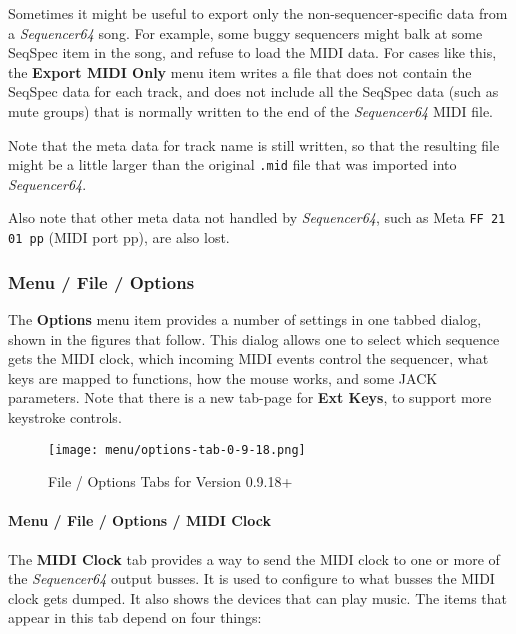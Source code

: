    Sometimes it might be useful to export only the non-sequencer-specific
   data from a \textsl{Sequencer64} song.  For example, some buggy sequencers
   might balk at some SeqSpec item in the song, and refuse to load the MIDI
   data.  For cases like this,
   the \textbf{Export MIDI Only} menu item writes a file that does not contain
   the SeqSpec data for each track, and does not include all the SeqSpec data
   (such as mute groups) that is normally written to the end of the
   \textsl{Sequencer64} MIDI file.

   Note that the meta data for track name is still written, so that the
   resulting file might be a little larger than the original
   \texttt{.mid} file that was imported into \textsl{Sequencer64}.

   Also note that other meta data not handled by \textsl{Sequencer64},
   such as Meta \texttt{FF 21 01 pp} (MIDI port pp), are also lost.

\subsubsection{Menu / File / Options}
\label{subsubsec:seq64_menu_file_options}

   The \textbf{Options} menu item provides a number of settings in one
   tabbed dialog, shown in the figures that follow.
   This dialog allows one to select which sequence gets the MIDI
   clock, which incoming MIDI events control the sequencer, what keys are
   mapped to functions, how the mouse works, and some JACK parameters.
   Note that there is a new tab-page for \textbf{Ext Keys}, to support
   more keystroke controls.

\begin{figure}[H]
   \centering 
   \texttt{[image: menu/options-tab-0-9-18.png]}
   \caption{File / Options Tabs for Version 0.9.18+}
   \label{fig:seq64_options_tab_0_9_18}
\end{figure}

\paragraph{Menu / File / Options / MIDI Clock}
\label{paragraph:seq64_menu_file_options_midi_clock}

   The \textbf{MIDI Clock} tab provides a way to send the MIDI clock to one
   or more of the \textsl{Sequencer64} output busses.
   It is used to configure to what busses the MIDI clock gets dumped.
   It also shows the devices that can play music.
   The items that appear in this tab depend on four things:

